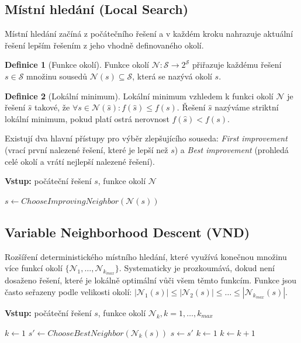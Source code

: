 \documentclass[12pt,a4paper]{article}
\theoremstyle{definition}
\newtheorem{definition}{Definice}
\begin{document}
\subsection{Místní hledání (Local Search)}
Místní hledání začíná z počátečního řešení a v každém kroku nahrazuje aktuální řešení lepším řešením z jeho vhodně definovaného okolí.

\begin{definition}[Funkce okolí]
Funkce okolí $\mathcal{N}: \mathcal{S} \rightarrow 2^{\mathcal{S}}$ přiřazuje každému řešení $s \in \mathcal{S}$ množinu sousedů $\mathcal{N}(s) \subseteq \mathcal{S}$, která se nazývá okolí $s$.
\end{definition}

\begin{definition}[Lokální minimum]
Lokální minimum vzhledem k funkci okolí $\mathcal{N}$ je řešení $\hat{s}$ takové, že $\forall s \in \mathcal{N}(\hat{s}): f(\hat{s}) \le f(s)$. Řešení $\hat{s}$ nazýváme striktní lokální minimum, pokud platí ostrá nerovnost $f(\hat{s}) < f(s)$.
\end{definition}

Existují dva hlavní přístupy pro výběr zlepšujícího souseda: \textit{First improvement} (vrací první nalezené řešení, které je lepší než $s$) a \textit{Best improvement} (prohledá celé okolí a vrátí nejlepší nalezené řešení).

\begin{algorithm}[H]
\caption{Local Search }
\textbf{Vstup:} počáteční řešení $s$, funkce okolí $\mathcal{N}$ 
\begin{algorithmic}[1]
\STATE $s \gets ChooseImprovingNeighbor(\mathcal{N}(s))$ 
\ENDWHILE
\end{algorithmic}
\end{algorithm}

\subsection{Variable Neighborhood Descent (VND)}
Rozšíření deterministického místního hledání, které využívá konečnou množinu více funkcí okolí $\{\mathcal{N}_1, \dots, \mathcal{N}_{k_{max}}\}$. Systematicky je prozkoumává, dokud není dosaženo řešení, které je lokálně optimální vůči všem těmto funkcím. Funkce jsou často seřazeny podle velikosti okolí: $|\mathcal{N}_1(s)| \le |\mathcal{N}_2(s)| \le \dots \le |\mathcal{N}_{k_{max}}(s)|$.

\begin{algorithm}[H]
\caption{Variable Neighborhood Descent (VND) }
\textbf{Vstup:} počáteční řešení $s$, funkce okolí $\mathcal{N}_k, k=1,\dots,k_{max}$ 
\begin{algorithmic}[1]
\STATE $k \gets 1$ 
\STATE $s' \gets ChooseBestNeighbor(\mathcal{N}_k(s))$ 
\STATE $s \gets s'$ 
\STATE $k \gets 1$ 
\ELSE
\STATE $k \gets k + 1$ 
\ENDIF
\ENDWHILE
\end{algorithmic}
\end{algorithm}
\end{document}
